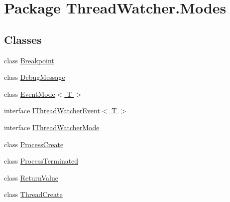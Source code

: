 \hypertarget{namespace_thread_watcher_1_1_modes}{\section{Package Thread\+Watcher.\+Modes}
\label{namespace_thread_watcher_1_1_modes}
}
\subsection*{Classes}
\begin{DoxyCompactItemize}
\item 
class \hyperlink{class_thread_watcher_1_1_modes_1_1_breakpoint}{Breakpoint}
\item 
class \hyperlink{class_thread_watcher_1_1_modes_1_1_debug_message}{Debug\+Message}
\item 
class \hyperlink{class_thread_watcher_1_1_modes_1_1_event_mode_3_01_t_01_4}{Event\+Mode$<$ T $>$}
\item 
interface \hyperlink{interface_thread_watcher_1_1_modes_1_1_i_thread_watcher_event_3_01_t_01_4}{I\+Thread\+Watcher\+Event$<$ T $>$}
\item 
interface \hyperlink{interface_thread_watcher_1_1_modes_1_1_i_thread_watcher_mode}{I\+Thread\+Watcher\+Mode}
\item 
class \hyperlink{class_thread_watcher_1_1_modes_1_1_process_create}{Process\+Create}
\item 
class \hyperlink{class_thread_watcher_1_1_modes_1_1_process_terminated}{Process\+Terminated}
\item 
class \hyperlink{class_thread_watcher_1_1_modes_1_1_return_value}{Return\+Value}
\item 
class \hyperlink{class_thread_watcher_1_1_modes_1_1_thread_create}{Thread\+Create}
\end{DoxyCompactItemize}
